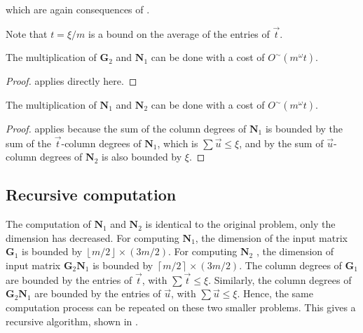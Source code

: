 which are again consequences of .%
\begin{comment}
\begin{lem}
\label{lem:sizeOfG2N1}The sum of the column degrees of $\mathbf{G}_{2}\mathbf{N}_{1}$
is bounded by $\xi$.\end{lem}
\begin{proof}
This follows from \prettyref{thm:boundOfSumOfShiftedDegreesOfKernelBasis}
and \prettyref{lem:boundOnDegreesOfFA}.\end{proof}
\end{comment}
{} Note that $t=\xi/m$ is a bound on the average of the entries of
$\vec{t}$.
\begin{lem}
\label{lem:mutiplyingG2N1}The multiplication of $\mathbf{G}_{2}$
and $\mathbf{N}_{1}$ can be done with a cost of $O^{\sim}(m^{\omega}t)$.\end{lem}
\begin{proof}
 applies directly here.\end{proof}
\begin{lem}
\label{lem:multiplyingN1N2}The multiplication of $\mathbf{N}_{1}$
and $\mathbf{N}_{2}$ can be done with a cost of $O^{\sim}(m^{\omega}t)$.\end{lem}
\begin{proof}
 applies because the sum
of the column degrees of $\mathbf{N}_{1}$ is bounded by the sum of
the $\vec{t}$-column degrees of $\mathbf{N}_{1}$, which is $\sum\vec{u}\le\xi$,
and by  the
sum of $\vec{u}$-column degrees of $\mathbf{N}_{2}$ is also bounded
by $\xi$. 
\end{proof}

\subsection{Recursive computation}

The computation of $\mathbf{N}_{1}$ and $\mathbf{N}_{2}$ is identical
to the original problem, only the dimension has decreased. For computing
$\mathbf{N}_{1}$, the dimension of the input matrix $\mathbf{G}_{1}$
is bounded by $\left\lfloor m/2\right\rfloor \times\left(3m/2\right)$.
For computing $\mathbf{N}_{2}$ , the dimension of input matrix $\mathbf{G}_{2}\mathbf{N}_{1}$
is bounded by $\left\lceil m/2\right\rceil \times(3m/2)$. The column
degrees of $\mathbf{G}_{1}$ are bounded by the entries of $\vec{t}$,
with $\sum\vec{t}\le\xi$. Similarly, the column degrees of $\mathbf{G}_{2}\mathbf{N}_{1}$
are bounded by the entries of $\vec{u}$, with $\sum\vec{u}\le\xi$.
Hence, the same computation process can be repeated on these two smaller
problems. This gives a recursive algorithm, shown in .


